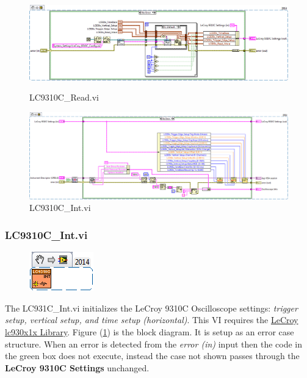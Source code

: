 \documentclass[11pt,a4paper,oldfontcommands]{memoir}
\begin{document}
\begin{figure}
	\includegraphics[width=\textheight,keepaspectratio]{LC931C_Read_blockdiagram}
	\caption{LC9310C\_Read.vi}
	\label{fig:LC9310C_Read_blkdig}
	\includegraphics[width=\textheight,keepaspectratio]{LC931C_Int_blockdiagram}
	\caption{LC9310C\_Int.vi}
	\label{fig:LC9310C_Int_blkdig}
\end{figure}

\subsubsection{LC9310C\_Int.vi}

\noindent\hrulefill

\begin{figure}[H]
	\includegraphics[scale=0.625]{LC931C_Int_main_02}
	\label{fig:LC9310C_Int_main_02}
\end{figure}

The LC931C\_Int.vi initializes the LeCroy 9310C Oscilloscope settings: \textit{trigger setup, vertical setup, and time setup (horizontal)}. This VI requires the \href{http://sine.ni.com/apps/utf8/niid_web_display.download_page?p_id_guid=E3B19B3E9608659CE034080020E74861}{LeCroy lc930x1x Library}. Figure (\ref{fig:LC9310C_Int_blkdig}) is the block diagram.  It is setup as an error case structure. When an error is detected from the \textit{error (in)} input then the code in the green box does not execute, instead the case not shown passes through the \textbf{LeCroy 9310C Settings} unchanged.
\end{document}

